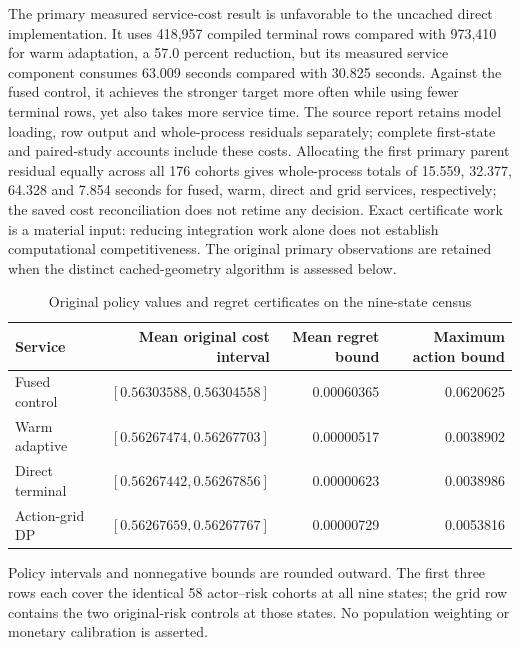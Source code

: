 The primary measured service-cost result is unfavorable to the uncached direct implementation. It uses 418,957 compiled terminal rows compared with 973,410 for warm adaptation, a 57.0 percent reduction, but its measured service component consumes 63.009 seconds compared with 30.825 seconds. Against the fused control, it achieves the stronger target more often while using fewer terminal rows, yet also takes more service time. The source report retains model loading, row output and
whole-process residuals separately; complete first-state and paired-study
accounts include these costs. Allocating the first primary parent residual equally across all 176 cohorts gives whole-process totals of 15.559, 32.377, 64.328 and 7.854 seconds for fused, warm, direct and grid services, respectively; the saved cost reconciliation does not retime any decision. Exact certificate work is a material input: reducing integration work alone does not establish computational competitiveness. The original primary observations are retained when the distinct cached-geometry algorithm is assessed below.

\begin{table}[t]\caption{Original policy values and regret certificates on the nine-state census}\label{tab:economics126}\centering

\begin{tabular}{lrrr}\toprule

Service & Mean original cost interval & Mean regret bound & Maximum action bound\\\midrule

Fused control & $[0.56303588,0.56304558]$ & 0.00060365 & 0.0620625 \\

Warm adaptive & $[0.56267474,0.56267703]$ & 0.00000517 & 0.0038902 \\

Direct terminal & $[0.56267442,0.56267856]$ & 0.00000623 & 0.0038986 \\

Action-grid DP & $[0.56267659,0.56267767]$ & 0.00000729 & 0.0053816 \\

\bottomrule\end{tabular}

\par\smallskip\footnotesize Policy intervals and nonnegative bounds are rounded outward. The first three rows each cover the identical 58 actor--risk cohorts at all nine states; the grid row contains the two original-risk controls at those states. No population weighting or monetary calibration is asserted.

\end{table}

